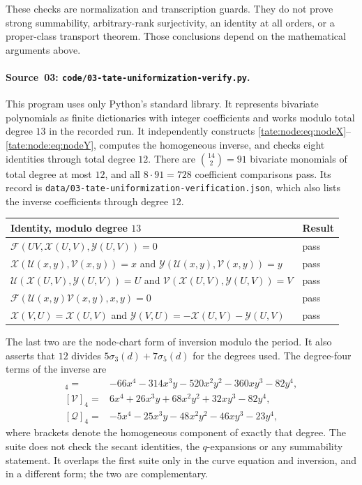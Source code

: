 \documentclass[11pt,letterpaper]{article}
\theoremstyle{definition}
\newcommand{\file}[1]{\nolinkurl{#1}}
\newcommand{\X}{\mathcal X}
\newcommand{\Y}{\mathcal Y}
\newcommand{\UU}{\mathcal U}
\newcommand{\VV}{\mathcal V}
\newcommand{\QQ}{\mathcal Q}
\newcommand{\Fp}{\mathcal F}
\begin{document}
These checks are normalization and transcription guards. They do not
prove strong summability, arbitrary-rank surjectivity, an identity at
all orders, or a proper-class transport theorem. Those conclusions
depend on the mathematical arguments above.

\paragraph{Source~03: \texttt{code/03-tate-uniformization-verify.py}.}
This program uses only Python's standard library. It represents bivariate
polynomials as finite dictionaries with integer coefficients and works
modulo total degree $13$ in the recorded run. It independently constructs
\eqref{tate:node:eq:nodeX}--\eqref{tate:node:eq:nodeY}, computes the
homogeneous inverse, and checks eight identities through total degree $12$.
There are $\binom{14}{2}=91$ bivariate monomials of total degree at most
$12$, and all $8\cdot91=728$ coefficient comparisons pass. Its record is
\file{data/03-tate-uniformization-verification.json}, which also lists the
inverse coefficients through degree $12$.
\begin{center}
\begin{tabular}{@{}p{}l@{}}
\toprule
Identity, modulo degree $13$ & Result\\
\midrule
$\Fp(UV,\X(U,V),\Y(U,V))=0$ & pass\\
$\X(\UU(x,y),\VV(x,y))=x$ and $\Y(\UU(x,y),\VV(x,y))=y$ & pass\\
$\UU(\X(U,V),\Y(U,V))=U$ and $\VV(\X(U,V),\Y(U,V))=V$ & pass\\
$\Fp(\UU(x,y)\VV(x,y),x,y)=0$ & pass\\
$\X(V,U)=\X(U,V)$ and $\Y(V,U)=-\X(U,V)-\Y(U,V)$ & pass\\
\bottomrule
\end{tabular}
\end{center}
The last two are the node-chart form of inversion modulo the period. It
also asserts that $12$ divides $5\sigma_3(d)+7\sigma_5(d)$ for the degrees
used. The degree-four terms of the inverse are
\begin{align*}
 [\UU]_4={}&-66x^4-314x^3y-520x^2y^2-360xy^3-82y^4,\\
 [\VV]_4={}&6x^4+26x^3y+68x^2y^2+32xy^3-82y^4,\\
 [\QQ]_4={}&-5x^4-25x^3y-48x^2y^2-46xy^3-23y^4,
\end{align*}
where brackets denote the homogeneous component of exactly that degree.
The suite does not check the secant identities, the $q$-expansions or any
summability statement. It overlaps the first suite only in the curve
equation and inversion, and in a different form; the two are complementary.
\end{document}
